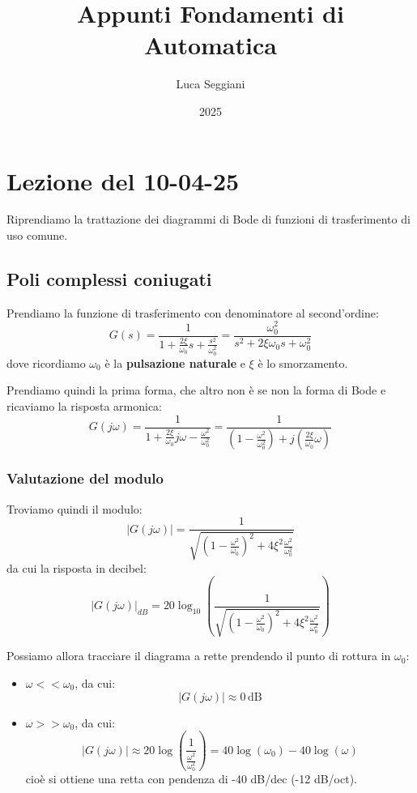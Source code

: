 \documentclass[a4paper,11pt]{article}
\title{Appunti Fondamenti di Automatica}
\author{Luca Seggiani}
\date{2025}
\begin{document}
\section{Lezione del 10-04-25}

\thispagestyle{empty}
\pagestyle{fancy}

Riprendiamo la trattazione dei diagrammi di Bode di funzioni di trasferimento di uso comune.

\subsection{Poli complessi coniugati}
Prendiamo la funzione di trasferimento con denominatore al second'ordine:
$$
G(s) = \frac{1}{1 + \frac{2 \xi}{\omega_0}s + \frac{s^2}{\omega_0^2}}
= \frac{\omega_0^2}{s^2 + 2 \xi \omega_0 s + \omega_0^2}
$$
dove ricordiamo $\omega_0$ è la \textbf{pulsazione naturale} e $\xi$ è lo smorzamento.

Prendiamo quindi la prima forma, che altro non è se non la forma di Bode e ricaviamo la risposta armonica:
$$
G(j \omega) = \frac{1}{1 + \frac{2 \xi}{\omega_0} j \omega - \frac{\omega^2}{\omega_0^2}} = \frac{1}{ \left( 1 - \frac{\omega^2}{\omega_0^2} \right) + j \left( \frac{2 \xi}{\omega_0} \omega \right) }
$$

\subsubsection{Valutazione del modulo}
Troviamo quindi il modulo:
$$
|G(j\omega)| = \frac{1}{ \sqrt{ \left( 1 - \frac{\omega^2}{\omega_0} \right)^2 + 4 \xi^2 \frac{\omega^2}{\omega_0^2} } }
$$
da cui la risposta in decibel:
$$
|G(j \omega)|_{dB} = 20 \log_{10} \left( \frac{1}{ \sqrt{ \left( 1 - \frac{\omega^2}{\omega_0} \right)^2 + 4 \xi^2 \frac{\omega^2}{\omega_0^2} } } \right) 
$$

Possiamo allora tracciare il diagrama a rette prendendo il punto di rottura in $\omega_0$:
\begin{itemize}
	\item $\omega << \omega_0$, da cui:
		$$
			|G(j\omega)| \approx 0 \, \mathrm{dB}
		$$
	\item $\omega >> \omega_0$, da cui:
		$$
			|G(j \omega)| \approx 20 \log \left( \frac{1}{ \frac{\omega^2}{\omega_0^2} } \right) = 40 \log(\omega_0) - 40 \log(\omega)
		$$
		cioè si ottiene una retta con pendenza di -40 dB/dec (-12 dB/oct).
\end{itemize}
\end{document}
